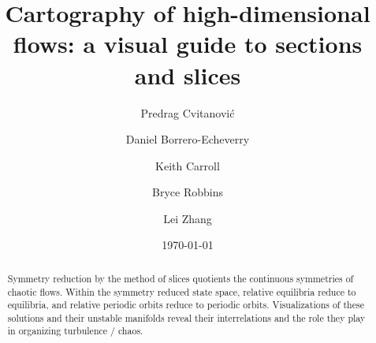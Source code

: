 \documentclass[aip,cha,reprint,
secnumarabic,
nofootinbib, tightenlines,
nobibnotes, showkeys, showpacs,
]{revtex4-1}
\begin{document}
\title[High-dimensional cartography]
{Cartography of high-dimensional flows: a visual guide to sections and slices}


\author{Predrag Cvitanovi{\'c}}
\author{Daniel Borrero-Echeverry}
\author{Keith Carroll}
\author{Bryce Robbins}
\author{Lei Zhang}

\date{\today}

\begin{abstract}
Symmetry reduction by the method of slices quotients the continuous
symmetries of chaotic flows. Within the symmetry reduced state space,
relative equilibria reduce to equilibria, and relative periodic orbits reduce to
periodic orbits. Visualizations of these solutions and their unstable
manifolds reveal their interrelations and the role they play in
organizing turbulence / chaos.

\end{abstract}


\maketitle
\end{document}
